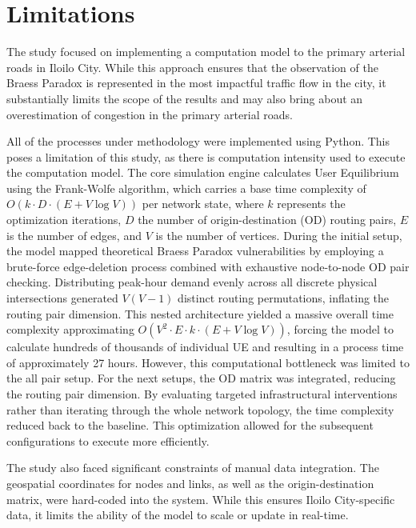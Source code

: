 \section{Limitations}
\label{sec:limitations}

The study focused on implementing a computation model to the primary arterial roads in Iloilo City. While this approach ensures that the observation of the Braess Paradox is represented in the most impactful traffic flow in the city, it substantially limits the scope of the results and may also bring about an overestimation of congestion in the primary arterial roads.

All of the processes under methodology were implemented using Python. This poses a limitation of this study, as there is computation intensity used to execute the computation model. The core simulation engine calculates User Equilibrium using the Frank-Wolfe algorithm, which carries a base time complexity of $O(k \cdot D \cdot (E + V \log V))$ per network state, where $k$ represents the optimization iterations, $D$ the number of origin-destination (OD) routing pairs, $E$ is the number of edges, and $V$ is the number of vertices. During the initial setup, the model mapped theoretical Braess Paradox vulnerabilities by employing a brute-force edge-deletion process combined with exhaustive node-to-node OD pair checking. Distributing peak-hour demand evenly across all discrete physical intersections generated $V(V-1)$ distinct routing permutations, inflating the routing pair dimension. This nested architecture yielded a massive overall time complexity approximating $O(V^2 \cdot E \cdot k \cdot (E + V \log V))$, forcing the model to calculate hundreds of thousands of individual UE and resulting in a process time of approximately 27 hours. However, this computational bottleneck was limited to the all pair setup. For the next setups, the OD matrix was integrated, reducing the routing pair dimension. By evaluating targeted infrastructural interventions rather than iterating through the whole network topology, the time complexity reduced back to the baseline. This optimization allowed for the subsequent configurations to execute more efficiently.

The study also faced significant constraints of manual data integration. The geospatial coordinates for nodes and links, as well as the origin-destination matrix, were hard-coded into the system. While this ensures Iloilo City-specific data, it limits the ability of the model to scale or update in real-time.


